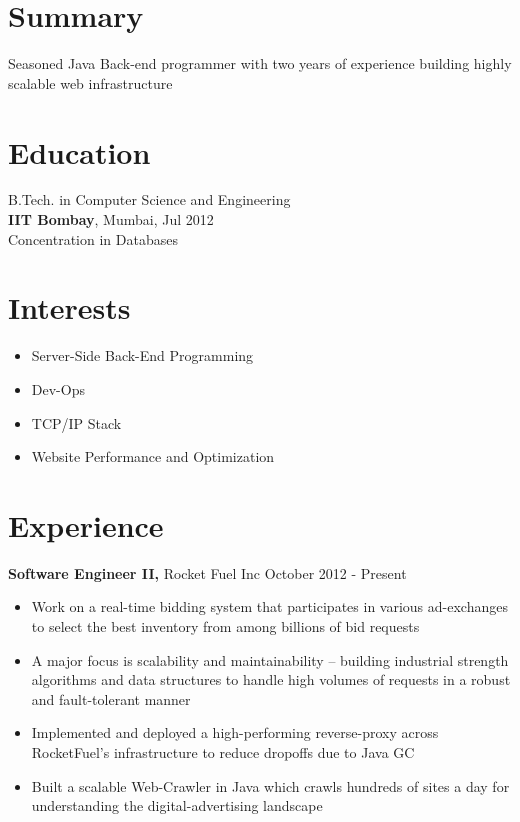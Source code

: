 \documentclass[margin]{res}
\begin{document}

\address{ \href{http://ankush.io/}{http://ankush.io} }
\address{ ankush@ankush.io }

\begin{resume}

\section{Summary}
  Seasoned Java Back-end programmer with two years of experience building highly scalable web infrastructure

\section{Education}
  B.Tech. in Computer Science and Engineering \\
  {\bf IIT Bombay}, Mumbai, Jul 2012 \\
  Concentration in Databases

\section{Interests}
 \begin{itemize} \itemsep -2pt  %
 \item Server-Side Back-End Programming
 \item Dev-Ops
 \item TCP/IP Stack
 \item Website Performance and Optimization
 \end{itemize}

\section{Experience}
 {\bf Software Engineer II,} Rocket Fuel Inc \hfill October 2012 - Present
 \begin{itemize} \itemsep -2pt  %
 \item Work on a real-time bidding system that participates in various ad-exchanges to select the best inventory from among billions of bid requests
 \item A major focus is scalability and maintainability -- building industrial strength algorithms and data structures to handle high volumes of requests in a robust and fault-tolerant manner
 \item Implemented and deployed a high-performing reverse-proxy across RocketFuel's infrastructure to reduce dropoffs due to Java GC
 \item Built a scalable Web-Crawler in Java which crawls hundreds of sites a day for understanding the digital-advertising landscape
 \end{itemize}


\end{resume}
\end{document}
